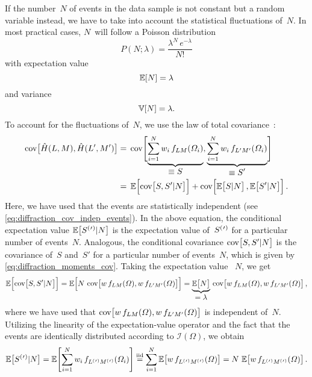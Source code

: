 If the number~$N$ of events in the data sample is not constant but a
random variable instead, we have to take into account the statistical
fluctuations of~$N$.  In most practical cases, $N$~will follow a
Poisson distribution
\begin{equation}
  P(N; \lambda)
  = \frac{\lambda^N\, e^{-\lambda}}{N!}
\end{equation}
with expectation value
\begin{equation}
  \exptVal{N} = \lambda
\end{equation}
and variance
\begin{equation}
  \var{N} = \lambda.
\end{equation}
To account for the fluctuations of~$N$, we use the law of total
covariance~\cite{wikipedia:lawOfTotalCovariance}:
\begin{align}
  \label{eq:diffraction_moments_law_of_total_cov}
  \cov[1]{\hat{H}(L, M), \hat{H}(L', M')}
  ={}& \cov[4]{\dUnderbrace{\sum_{i = 1}^N w_i\, f_{L M}(\Omega_i)}{\equiv S},
               \dUnderbrace{\sum_{i = 1}^N w_i\, f_{L' M'}(\Omega_i)}{\equiv S'}} \nonumber
  \\
  ={}& \exptVal[2]{\cov[1]{S, S' | N}} + \cov[2]{\exptVal[1]{S | N}, \exptVal[1]{S' | N}}.
\end{align}
Here, we have used that the events are statistically independent (see
\cref{eq:diffraction_cov_indep_events}).  In the above equation, the
conditional expectation value $\exptVal[1]{\orPr{S} | N}$ is the
expectation value of~$\orPr{S}$ for a particular number of events~$N$.
Analogous, the conditional covariance $\cov[1]{S, S' | N}$ is the
covariance of~$S$ and~$S'$ for a particular number of events~$N$,
which is given by \cref{eq:diffraction_moments_cov}.  Taking the
expectation value \wrt~$N$, we get
\begin{equation}
  \label{eq:diffraction_moments_expt_cov_sums}
  \exptVal[2]{\cov[1]{S, S' | N}}
  = \exptVal[2]{N\, \cov[1]{w\, f_{L M}(\Omega), w\, f_{L' M'}(\Omega)}}
  = \dUnderbrace{\exptVal[1]{N}}{= \lambda}\, \cov[1]{w\, f_{L M}(\Omega), w\, f_{L' M'}(\Omega)},
\end{equation}
where we have used that $\cov[1]{w\, f_{L M}(\Omega), w\, f_{L'
M'}(\Omega)}$ is independent of~$N$.  Utilizing the linearity of the
expectation-value operator and the fact that the events are
identically distributed according to $\mathcal{I}(\Omega)$, we obtain
\begin{equation}
  \exptVal[1]{\orPr{S} | N}
  = \exptVal[4]{\sum_{i = 1}^N w_i\, f_{\orPr{L} \orPr{M}}(\Omega_i)}
  \equalUsing{\text{iid}} \sum_{i = 1}^N \exptVal[1]{w\, f_{\orPr{L} \orPr{M}}(\Omega)}
  = N\, \exptVal[1]{w\, f_{\orPr{L} \orPr{M}}(\Omega)}.
\end{equation}
